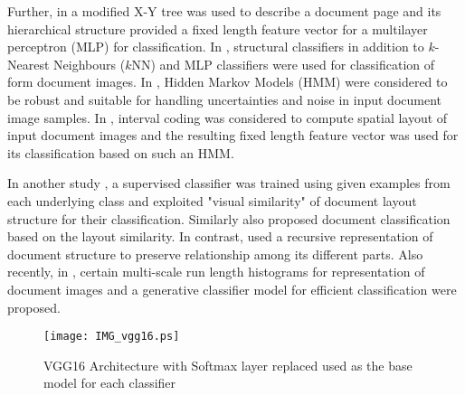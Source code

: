 \documentclass[10pt,conference,a4paper]{IEEEtran}
\begin{document}
Further, in \cite{cesarini2001} a modified X-Y tree was used to describe a document page and its hierarchical structure provided a fixed length feature vector for a multilayer perceptron (MLP) for classification. In \cite{heroux1998}, structural classifiers in addition to $k$-Nearest Neighbours ($k$NN) and MLP classifiers were used for classification of form document images. In \cite{rabiner1990}, Hidden Markov Models (HMM) were considered to be robust and suitable for handling uncertainties and noise in input document image samples. In \cite{hu2000}, interval coding was considered to compute spatial layout of input document images and the resulting fixed length feature vector was used for its classification based on such an HMM.

In another study \cite{shin2001}, a supervised classifier was trained using  given examples from each underlying class and exploited "visual similarity" of document layout structure for their classification. Similarly \cite{hu2000} also proposed document classification based on the layout similarity. In contrast, \cite{diligenti2003} used a recursive representation of document structure to preserve relationship among its different parts. Also recently, in \cite{gordo2013}, certain multi-scale run length histograms for representation of document images and a generative classifier model for efficient classification were proposed.


\begin{figure}[t]
	\centering
	\texttt{[image: IMG\_vgg16.ps]}
	\caption{VGG16 Architecture with Softmax layer replaced used as the base model for each classifier} \label{fig:DCNNarch}
\end{figure}
\end{document}
